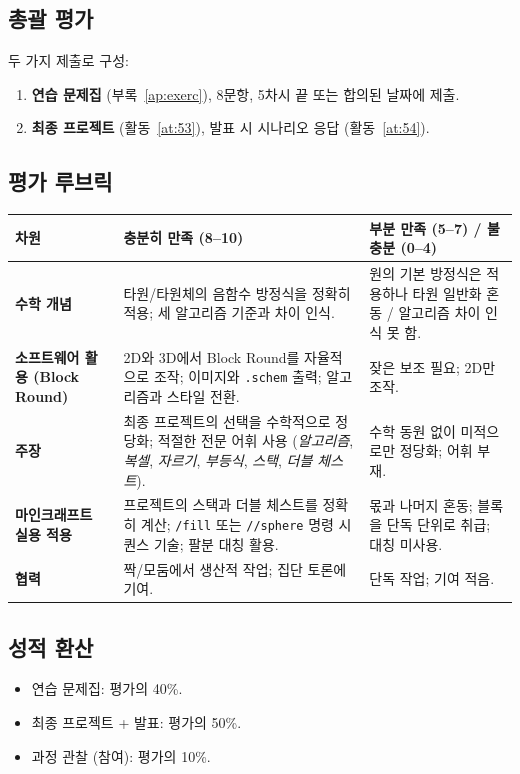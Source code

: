 \documentclass[12pt,a4paper]{scrartcl}
\newcommand{\cmd}[1]{\textcolor{earth}{\texttt{\small #1}}}
\begin{document}
\subsection{총괄 평가}
두 가지 제출로 구성:

\begin{enumerate}[leftmargin=1.5em,itemsep=0.2em,topsep=0.3em,nosep]
  \item \textbf{연습 문제집} (부록~\ref{ap:exerc}), 8문항, 5차시 끝 또는 합의된 날짜에 제출.
  \item \textbf{최종 프로젝트} (활동~\ref{at:53}), 발표 시 시나리오 응답 (활동~\ref{at:54}).
\end{enumerate}

\subsection{평가 루브릭}

\begin{center}
\small
\begin{tabularx}{\textwidth}{@{}p{}XX@{}}
\toprule
\textbf{차원} & \textbf{충분히 만족 (8--10)} & \textbf{부분 만족 (5--7) / 불충분 (0--4)} \\
\midrule
\textbf{수학 개념} & 타원/타원체의 음함수 방정식을 정확히 적용; 세 알고리즘 기준과 차이 인식. & 원의 기본 방정식은 적용하나 타원 일반화 혼동 / 알고리즘 차이 인식 못 함. \\
\addlinespace[3pt]
\textbf{소프트웨어 활용 (Block Round)} & 2D와 3D에서 Block Round를 자율적으로 조작; 이미지와 \texttt{.schem} 출력; 알고리즘과 스타일 전환. & 잦은 보조 필요; 2D만 조작. \\
\addlinespace[3pt]
\textbf{주장} & 최종 프로젝트의 선택을 수학적으로 정당화; 적절한 전문 어휘 사용 (\emph{알고리즘}, \emph{복셀}, \emph{자르기}, \emph{부등식}, \emph{스택}, \emph{더블 체스트}). & 수학 동원 없이 미적으로만 정당화; 어휘 부재. \\
\addlinespace[3pt]
\textbf{마인크래프트 실용 적용} & 프로젝트의 스택과 더블 체스트를 정확히 계산; \cmd{/fill} 또는 \cmd{//sphere} 명령 시퀀스 기술; 팔분 대칭 활용. & 몫과 나머지 혼동; 블록을 단독 단위로 취급; 대칭 미사용. \\
\addlinespace[3pt]
\textbf{협력} & 짝/모둠에서 생산적 작업; 집단 토론에 기여. & 단독 작업; 기여 적음. \\
\bottomrule
\end{tabularx}
\end{center}

\subsection{성적 환산}
\begin{itemize}[leftmargin=1.3em,itemsep=0.1em,topsep=0.2em,nosep]
  \item 연습 문제집: 평가의 40\%.
  \item 최종 프로젝트 + 발표: 평가의 50\%.
  \item 과정 관찰 (참여): 평가의 10\%.
\end{itemize}
\end{document}
